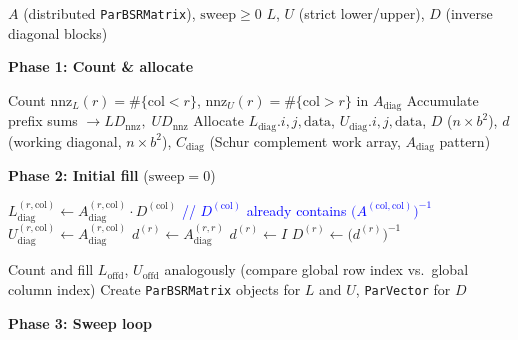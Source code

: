 \documentclass[11pt,a4paper]{article}
\newcommand{\Comment}[1]{\hfill\textcolor{blue}{// #1}}
\begin{document}
\begin{algorithm}[H]
\caption{{\tt jx\_ILUSetupFGPBILU\_v3} --- BSR Block ILU(0) Factorization}
\label{alg:bilu}
\begin{algorithmic}[1]
\Require $A$ (distributed \texttt{ParBSRMatrix}), $\text{sweep} \ge 0$
\Ensure $L$, $U$ (strict lower/upper), $D$ (inverse diagonal blocks)

\Statex \textbf{Phase 1: Count \& allocate}

    \State Count $\text{nnz}_L(r) = \#\{\text{col} < r\}$,
           $\text{nnz}_U(r) = \#\{\text{col} > r\}$ in $A_{\text{diag}}$
    \State Accumulate prefix sums $\to LD_{\text{nnz}},\; UD_{\text{nnz}}$
\EndFor
\State Allocate $L_{\text{diag}}.\!i,j,\text{data}$, $U_{\text{diag}}.\!i,j,\text{data}$,
        $D$ ($n \times b^2$), $d$ (working diagonal, $n \times b^2$),
        $C_{\text{diag}}$ (Schur complement work array, $A_{\text{diag}}$ pattern)
\Statex

\Statex \textbf{Phase 2: Initial fill} ($\text{sweep}=0$)

            \State $\displaystyle L_{\text{diag}}^{(r,\text{col})}
                \gets A_{\text{diag}}^{(r,\text{col})} \cdot D^{(\text{col})}$
                \Comment{$D^{(\text{col})}$ already contains $\bigl(A^{(\text{col},\text{col})}\bigr)^{-1}$}
            \State $U_{\text{diag}}^{(r,\text{col})} \gets A_{\text{diag}}^{(r,\text{col})}$
        \Else
            \State $d^{(r)} \gets A_{\text{diag}}^{(r,r)}$
                \State $d^{(r)} \gets I$
            \EndIf
            \State $D^{(r)} \gets \bigl(d^{(r)}\bigr)^{-1}$
        \EndIf
    \EndFor
\EndFor
\Statex

    \State Count and fill $L_{\text{offd}}$, $U_{\text{offd}}$ analogously
          (compare global row index vs.\ global column index)
\EndIf
\State Create \texttt{ParBSRMatrix} objects for $L$ and $U$,
      \texttt{ParVector} for $D$
\Statex

\Statex \textbf{Phase 3: Sweep loop}


\end{algorithmic}
\end{algorithm}
\end{document}
